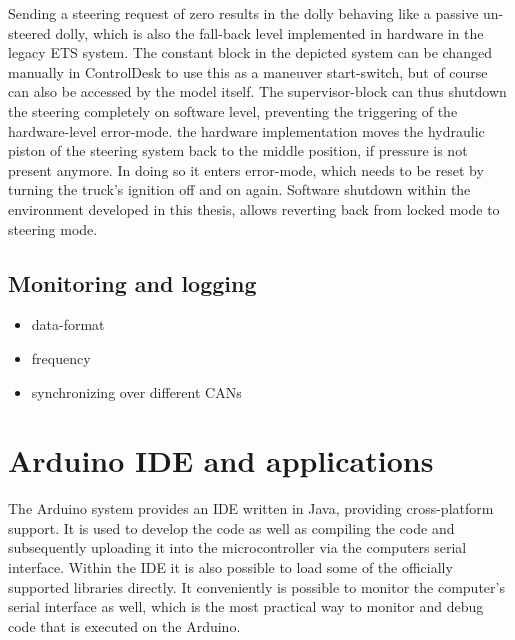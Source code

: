 \documentclass[ExampleMasters.tex]{subfiles}
\begin{document}
Sending a steering request of zero results in the dolly behaving like a passive un-steered dolly, which is also the fall-back level implemented in hardware in the legacy \gls{ETS} system. The constant block in the depicted system can be changed manually in ControlDesk to use this as a maneuver start-switch, but of course can also be accessed by the model itself. The supervisor-block can thus shutdown the steering completely on software level, preventing the triggering of the hardware-level error-mode. the hardware implementation moves the hydraulic piston of the steering system back to the middle position, if pressure is not present anymore. In doing so it enters error-mode, which needs to be reset by turning the truck's ignition off and on again. Software shutdown within the environment developed in this thesis, allows reverting back from locked mode to steering mode. 






\subsection{Monitoring and logging}
\begin{itemize}
	\item data-format
	\item frequency
	\item synchronizing over different CANs	
\end{itemize}


\section{Arduino IDE and applications}
\label{sec:arduino_applications}

The Arduino system provides an \gls{IDE}  written in Java, providing cross-platform support. It is used to develop the code as well as compiling the code and subsequently uploading it into the microcontroller via the computers serial interface. Within the IDE it is also possible to load some of the officially supported libraries directly. It conveniently is possible to monitor the computer's serial interface as well, which is the most practical way to monitor and debug code that is executed on the Arduino. 
\end{document}
